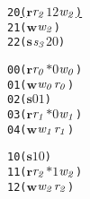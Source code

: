 \newsavebox{\boxthreeno}
\begin{lrbox}{\boxthreeno}
\begin{minipage}[t]{0.65\linewidth}
\large
\begin{alltt}
20 \underline{(\(\mathbf{r}\) \(\mathit{r\sb{2}}\) \(\mathit{1 2}\) \(\mathit{w\sb{2}}\))}
21 (\(\mathbf{w}\) \(\mathit{w\sb{2}}\))
22 (\(\mathbf{s}\) \(\mathit{s\sb{3}}\) \(\mathit{2 0}\))
\end{alltt}
\end{minipage}
\end{lrbox}


\newcommand\examplefigfour{
\begin{figure*}[tb]
\begin{center}
\setlength{\tabcolsep}{2pt}
\begin{tabular}[t]{c|c|c}
$p_0$ & $p_1$ & $p_2$ \\
\hline
\scalebox{0.8}{\usebox{\boxoneno}}&
\scalebox{0.8}{\usebox{\boxtwono}} &
\scalebox{0.8}{\usebox{\boxthreeno}}\\
\end{tabular}
\end{center}
\caption{No Deadlock Caused by Circular Dependency in Messages}
\label{fig:nodeadlock2}
\end{figure*}
}

\newsavebox{\boxonezerobuffer}
\begin{lrbox}{\boxonezerobuffer}
\begin{minipage}[t]{0.65\linewidth}
\large
\begin{alltt}
00 (\(\mathbf{r}\) \(\mathit{r\sb{0}}\) \(\mathit{\ast 0}\) \(\mathit{w\sb{0}}\)) 
01 (\(\mathbf{w}\) \(\mathit{w\sb{0}}\) \(\mathit{r\sb{0}}\))
02 (\(\mathbf{s}\) \(\mathit{0 1}\)) 
03 (\(\mathbf{r}\) \(\mathit{r\sb{1}}\) \(\mathit{\ast 0}\) \(\mathit{w\sb{1}}\)) 
04 (\(\mathbf{w}\) \(\mathit{w\sb{1}}\) \(\mathit{r\sb{1}}\))
\end{alltt}
\end{minipage}
\end{lrbox}

\newsavebox{\boxtwozerobuffer}
\begin{lrbox}{\boxtwozerobuffer}
\begin{minipage}[t]{0.65\linewidth}
\large
\begin{alltt}
10 (\(\mathbf{s}\) \(\mathit{1 0}\)) 
11 (\(\mathbf{r}\) \(\mathit{r\sb{2}}\) \(\mathit{\ast 1}\) \(\mathit{w\sb{2}}\)) 
12 (\(\mathbf{w}\) \(\mathit{w\sb{2}}\) \(\mathit{r\sb{2}}\))
\end{alltt}
\end{minipage}
\end{lrbox}

